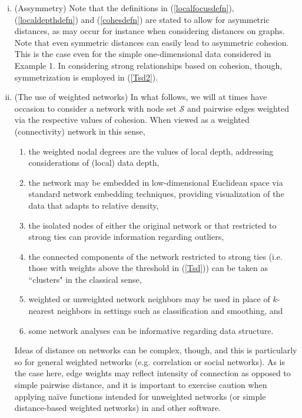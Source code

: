 \begin{enumerate}[(i)]
\item (Assymmetry) Note that the definitions in (\ref{localfocusdefn}), (\ref{localdepthdefn}) and (\ref{cohesdefn}) are stated to allow for asymmetric distances, as may occur for instance when considering distances on graphs. Note that even symmetric distances can easily lead to asymmetric cohesion. This is the case even for the simple one-dimensional data considered in Example 1. In considering strong relationships based on cohesion, though, symmetrization is employed in (\ref{Tsd2}).

\item (The use of weighted networks) In what follows, we will at times have occasion to consider a network with node set $\mathcal{S}$ and pairwise edges weighted via the respective values of cohesion. When viewed as a weighted (connectivity) network in this sense,

\begin{enumerate}
\item the weighted nodal degrees are the values of local depth, addressing considerations of (local) data depth,
\item the network may be embedded in low-dimensional Euclidean space via standard network embedding techniques, providing visualization of the data that adapts to relative density,
\item the isolated nodes of either the original network or that restricted to strong ties can provide information regarding outliers,
\item the connected components of the network restricted to strong ties (i.e. those with weights above the threshold in (\ref{Tsd})) can be taken as ``clusters" in the classical sense,
\item weighted or unweighted network neighbors may be used in place of $k$-nearest neighbors in settings such as classification and
smoothing, and
\item some network analyses can be informative regarding data structure.
\end{enumerate}

\noindent Ideas of distance on networks can be complex, though, and this is particularly so for general weighted networks (e.g.  correlation or social networks). As is the case here, edge weights may reflect intensity of connection as opposed to simple pairwise distance, and it is important to exercise caution when applying naïve functions intended for unweighted networks (or simple distance-based weighted networks) in  and other software.


\end{enumerate}
